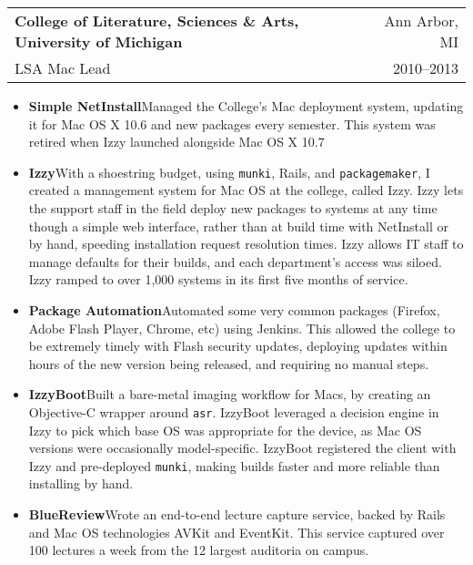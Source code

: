 \documentclass[letterpaper,10pt]{article}
\makeatletter
\newcommand{\munki}{\texttt{munki}}
\newcommand{\resumeItem}[2]{
  \item\small{
    \textbf{#1}{\hspace{0.6em}#2}
  }
}
\newcommand{\resumeSubheading}[4]{
  \item
    \begin{tabular*}{0.97\textwidth}[t]{l@{\extracolsep{\fill}}r}
      \textbf{#1} & #2 \\
      {\small #3} & {\small #4} \\
    \end{tabular*}\vspace{-6pt}
}
\newcommand{\resumeItemListStart}{\begin{itemize}}
\newcommand{\resumeItemListEnd}{\end{itemize}}
\makeatother
\begin{document}

    \resumeSubheading
      {College of Literature, Sciences \& Arts, University of Michigan}{Ann Arbor, MI}
      {LSA Mac Lead}{2010--2013}
      \resumeItemListStart
        \resumeItem{Simple NetInstall}
          {Managed the College's Mac deployment system, updating it for Mac OS X 10.6 and new packages every semester. This system was retired when Izzy launched alongside Mac OS X 10.7}
        \resumeItem{Izzy}
          {With a shoestring budget, using \munki, Rails, and \texttt{packagemaker}, I created a management system for Mac OS at the college, called Izzy. Izzy lets the support staff in the field deploy new packages to systems at any time though a simple web interface, rather than at build time with NetInstall or by hand, speeding installation request resolution times. Izzy allows IT staff to manage defaults for their builds, and each department's access was siloed. Izzy ramped to over 1,000 systems in its first five months of service.}
        \resumeItem{Package Automation}
          {Automated some very common packages (Firefox, Adobe Flash Player, Chrome, etc) using Jenkins. This allowed the college to be extremely timely with Flash security updates, deploying updates within hours of the new version being released, and requiring no manual steps.}
        \resumeItem{IzzyBoot}
          {Built a bare-metal imaging workflow for Macs, by creating an Objective-C wrapper around \texttt{asr}. IzzyBoot leveraged a decision engine in Izzy to pick which base OS was appropriate for the device, as Mac OS versions were occasionally model-specific. IzzyBoot registered the client with Izzy and pre-deployed \munki, making builds faster and more reliable than installing by hand.}
        \resumeItem{BlueReview}
          {Wrote an end-to-end lecture capture service, backed by Rails and Mac OS technologies AVKit and EventKit. This service captured over 100 lectures a week from the 12 largest auditoria on campus.}
      \resumeItemListEnd
\end{document}
